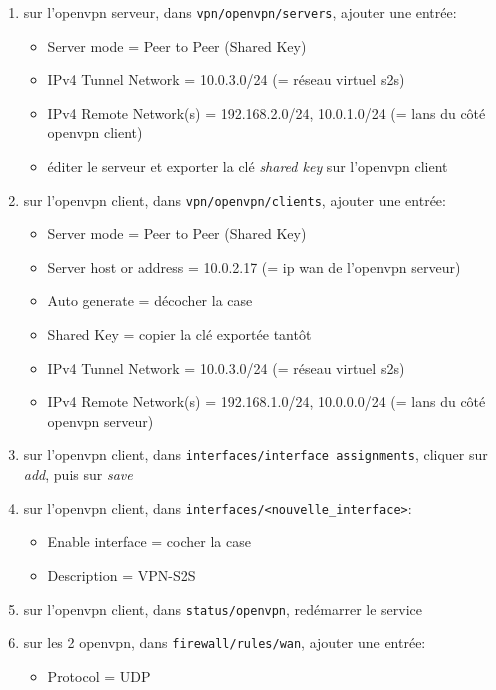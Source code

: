 \documentclass[a4paper]{article}
\begin{document}
\begin{enumerate}
    \item sur l'openvpn serveur, dans \texttt{vpn/openvpn/servers}, ajouter une entrée:
    \begin{itemize}
        \item Server mode = Peer to Peer (Shared Key)
        \item IPv4 Tunnel Network = 10.0.3.0/24 (= réseau virtuel s2s)
        \item IPv4 Remote Network(s) = 192.168.2.0/24, 10.0.1.0/24 (= lans du côté openvpn client)
        \item éditer le serveur et exporter la clé \textit{shared key} sur l'openvpn client
    \end{itemize}
    \item sur l'openvpn client, dans \texttt{vpn/openvpn/clients}, ajouter une entrée:
    \begin{itemize}
        \item Server mode = Peer to Peer (Shared Key)
        \item Server host or address = 10.0.2.17 (= ip wan de l'openvpn serveur)
        \item Auto generate = décocher la case
        \item Shared Key = copier la clé exportée tantôt
        \item IPv4 Tunnel Network = 10.0.3.0/24 (= réseau virtuel s2s)
        \item IPv4 Remote Network(s) = 192.168.1.0/24, 10.0.0.0/24 (= lans du côté openvpn serveur)
    \end{itemize}
    \item sur l'openvpn client, dans \texttt{interfaces/interface assignments}, cliquer sur \textit{add}, puis sur \textit{save}
    \item sur l'openvpn client, dans \texttt{interfaces/<nouvelle\_interface>}:
    \begin{itemize}
        \item Enable interface = cocher la case
        \item Description = VPN-S2S
    \end{itemize}
    \item sur l'openvpn client, dans \texttt{status/openvpn}, redémarrer le service
    \item sur les 2 openvpn, dans \texttt{firewall/rules/wan}, ajouter une entrée:
    \begin{itemize}
        \item Protocol = UDP

\end{itemize}
\end{enumerate}
\end{document}
